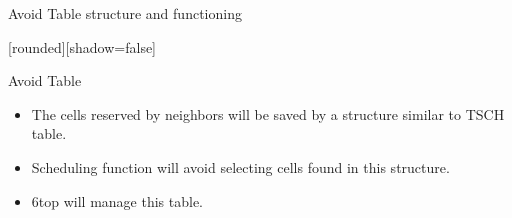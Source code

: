 \addtocounter{framenumber}{-1}
\begin{withoutheadline}
\begin{frame}{Avoid Table structure and functioning}


[rounded][shadow=false]
\begin{block}{Avoid Table}
    \begin{itemize}
     \item The cells reserved by neighbors will be saved by a structure similar to TSCH table. 
    \item<2-> Scheduling function will avoid selecting cells found in this structure. 
    \item<3-> 6top will manage this table.
    \end{itemize}
    \end{block}
    
    
\begin{figure}[p]

 
 
\end{figure}



\end{frame}
\end{withoutheadline}


